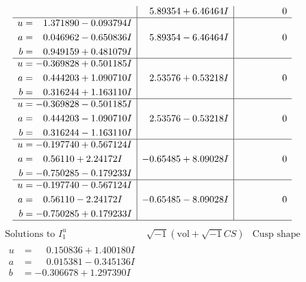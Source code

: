 \documentclass[1p]{elsarticle_modified}
\theoremstyle{definition}
\newcommand{\I}{\sqrt{-1}}
\begin{document}
$$\begin{array}{c|c|c}
 & \phantom{-}5.89354 + 6.46464 I & \phantom{-0.000000 } 0 \\ \hline\begin{aligned}
u &= \phantom{-}1.371890 - 0.093794 I \\
a &= \phantom{-}0.046962 - 0.650836 I \\
b &= \phantom{-}0.949159 + 0.481079 I\end{aligned}
 & \phantom{-}5.89354 - 6.46464 I & \phantom{-0.000000 } 0 \\ \hline\begin{aligned}
u &= -0.369828 + 0.501185 I \\
a &= \phantom{-}0.444203 + 1.090710 I \\
b &= \phantom{-}0.316244 + 1.163110 I\end{aligned}
 & \phantom{-}2.53576 + 0.53218 I & \phantom{-0.000000 } 0 \\ \hline\begin{aligned}
u &= -0.369828 - 0.501185 I \\
a &= \phantom{-}0.444203 - 1.090710 I \\
b &= \phantom{-}0.316244 - 1.163110 I\end{aligned}
 & \phantom{-}2.53576 - 0.53218 I & \phantom{-0.000000 } 0 \\ \hline\begin{aligned}
u &= -0.197740 + 0.567124 I \\
a &= \phantom{-}0.56110 + 2.24172 I \\
b &= -0.750285 - 0.179233 I\end{aligned}
 & -0.65485 + 8.09028 I & \phantom{-0.000000 } 0 \\ \hline\begin{aligned}
u &= -0.197740 - 0.567124 I \\
a &= \phantom{-}0.56110 - 2.24172 I \\
b &= -0.750285 + 0.179233 I\end{aligned}
 & -0.65485 - 8.09028 I & \phantom{-0.000000 } 0\\
 \hline 
 \end{array}$$\newpage$$\begin{array}{c|c|c}  
\text{Solutions to }I^u_{1}& \I (\text{vol} + \sqrt{-1}CS) & \text{Cusp shape}\\
 \hline 
\begin{aligned}
u &= \phantom{-}0.150836 + 1.400180 I \\
a &= \phantom{-}0.015381 - 0.345136 I \\
b &= -0.306678 + 1.297390 I\end{aligned}

\end{array}$$
\end{document}
